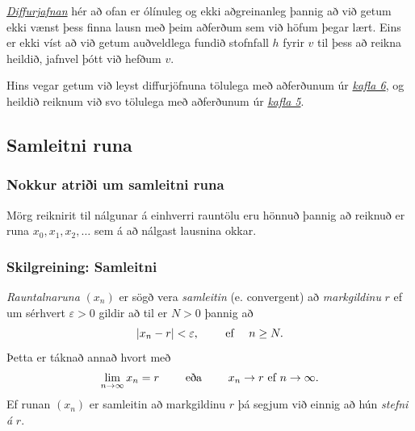 \documentclass[a4paper,10pt,icelandic]{sphinxmanual}
\begin{document}
{\hyperref[kafli01:eldflaug]{\emph{Diffurjafnan}}} hér að ofan er ólínuleg og ekki aðgreinanleg þannig
að við getum ekki vænst
þess finna lausn með þeim aðferðum sem við höfum þegar lært. Eins er
ekki víst að við getum auðveldlega fundið stofnfall \(h\) fyrir
\(v\) til þess að reikna heildið, jafnvel þótt við hefðum \(v\).

Hins vegar getum við leyst diffurjöfnuna tölulega með aðferðunum úr
{\hyperref[kafli06:upphafsgildisverkefni]{\emph{kafla 6}}},
og heildið reiknum við svo tölulega með aðferðunum úr {\hyperref[kafli05:heildun]{\emph{kafla 5}}}.


\subsection{Samleitni runa}
\label{kafli01:samleitni-runa}

\subsubsection{Nokkur atriði um samleitni runa}
\label{kafli01:nokkur-atrii-um-samleitni-runa}
Mörg reiknirit til nálgunar á einhverri rauntölu eru hönnuð þannig að
reiknuð er runa \(x_0,x_1,x_2,\dots\) sem á að nálgast lausnina
okkar.


\subsubsection{Skilgreining: Samleitni}
\label{kafli01:index-0}\label{kafli01:skilgreining-samleitni}
\emph{Rauntalnaruna} \((x_n)\) er sögð vera \emph{samleitin} (e. convergent)
að \emph{markgildinu} \(r\) ef um sérhvert \(\varepsilon>0\) gildir
að til er \(N>0\) þannig að
\begin{gather}
\begin{split}|x_n-r|<\varepsilon, \qquad \text{ ef } \quad n\geq N.\end{split}\notag
\end{gather}
Þetta er táknað annað hvort með
\begin{gather}
\begin{split}\lim_{n\to \infty}x_n=r \qquad \text{ eða } \qquad  x_n\to r
    \text{ ef } n\to \infty.\end{split}\notag
\end{gather}
Ef runan \((x_n)\) er samleitin að markgildinu \(r\) þá segjum
við einnig að hún \emph{stefni á} \(r\).
\end{document}
